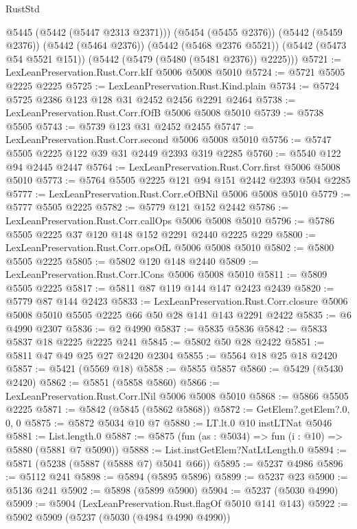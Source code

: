 \begin{lexlean}{RustStd}
\begin{coremodule}
        @5445
        (@5442 (@5447 @2313 @2371)))
      (@5454 (@5455 @2376))
      (@5442 (@5459 @2376))
      (@5442 (@5464 @2376))
      (@5442 (@5468 @2376 @5521))
      (@5442 (@5473 @54 @5521 @151))
      (@5442 (@5479 (@5480 (@5481 @2376)) @2225)))
@5721 := LexLeanPreservation.Rust.Corr.kIf @5006 @5008 @5010
@5724 := @5721 @5505 @2225 @2225
@5725 := LexLeanPreservation.Rust.Kind.plain
@5734 := @5724 @5725 @2386 @123 @128 @31 @2452 @2456 @2291 @2464
@5738 := LexLeanPreservation.Rust.Corr.fOfB @5006 @5008 @5010
@5739 := @5738 @5505
@5743 := @5739 @123 @31 @2452 @2455
@5747 := LexLeanPreservation.Rust.Corr.second @5006 @5008 @5010
@5756 := @5747 @5505 @2225 @122 @39 @31 @2449 @2393 @319 @2285
@5760 := @5540 @122 @94 @2445 @2447
@5764 := LexLeanPreservation.Rust.Corr.first @5006 @5008 @5010
@5773 := @5764 @5505 @2225 @121 @94 @151 @2442 @2393 @504 @2285
@5777 := LexLeanPreservation.Rust.Corr.eOfBNil @5006 @5008 @5010
@5779 := @5777 @5505 @2225
@5782 := @5779 @121 @152 @2442
@5786 := LexLeanPreservation.Rust.Corr.callOps @5006 @5008 @5010
@5796 := @5786 @5505 @2225 @37 @120 @148 @152 @2291 @2440 @2225 @229
@5800 := LexLeanPreservation.Rust.Corr.opsOfL @5006 @5008 @5010
@5802 := @5800 @5505 @2225
@5805 := @5802 @120 @148 @2440
@5809 := LexLeanPreservation.Rust.Corr.lCons @5006 @5008 @5010
@5811 := @5809 @5505 @2225
@5817 := @5811 @87 @119 @144 @147 @2423 @2439
@5820 := @5779 @87 @144 @2423
@5833 := LexLeanPreservation.Rust.Corr.closure
    @5006
    @5008
    @5010
    @5505
    @2225
    @66
    @50
    @28
    @141
    @143
    @2291
    @2422
@5835 := @6 @4990 @2307
@5836 := @2 @4990
@5837 := @5835 @5836
@5842 := @5833 @5837 @18 @2225 @2225 @241
@5845 := @5802 @50 @28 @2422
@5851 := @5811 @47 @49 @25 @27 @2420 @2304
@5855 := @5564 @18 @25 @18 @2420
@5857 := @5421 (@5569 @18)
@5858 := @5855 @5857
@5860 := @5429 (@5430 @2420)
@5862 := @5851 (@5858 @5860)
@5866 := LexLeanPreservation.Rust.Corr.lNil @5006 @5008 @5010
@5868 := @5866 @5505 @2225
@5871 := @5842 (@5845 (@5862 @5868))
@5872 := GetElem?.getElem?.{0, 0, 0}
@5875 := @5872 @5034 @10 @7
@5880 := LT.lt.{0} @10 instLTNat @5046
@5881 := List.length.{0}
@5887 := @5875 (fun (as : @5034) => fun (i : @10) => @5880 (@5881 @7 @5090))
@5888 := List.instGetElem?NatLtLength.{0}
@5894 := @5871 (@5238 (@5887 (@5888 @7) @5041 @66))
@5895 := @5237 @4986
@5896 := @5112 @241
@5898 := @5894 (@5895 @5896)
@5899 := @5237 @23
@5900 := @5136 @241
@5902 := @5898 (@5899 @5900)
@5904 := @5237 (@5030 @4990)
@5909 := @5904 (LexLeanPreservation.Rust.flagOf @5010 @141 @143)
@5922 := @5902
    @5909
    (@5237
      (@5030 (@4984 @4990 @4990))

\end{coremodule}
\end{lexlean}
